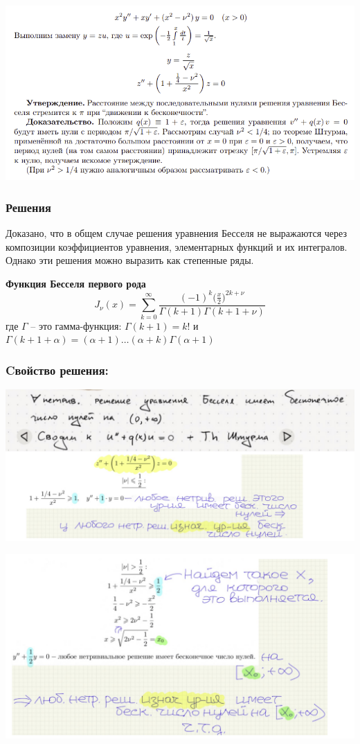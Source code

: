 \noindent\includegraphics[width=0.95\linewidth]{images/bess.png}

\subsubsection*{Решения}
Доказано, что в общем случае решения уравнения Бесселя не выражаются через композиции коэффициентов уравнения, элементарных функций и их интегралов. Однако эти
решения можно выразить как степенные ряды.

\textbf{Функция Бесселя первого рода}
\begin{equation*}
    J_\nu(x) = \sum\limits_{k=0}^{\infty}{\frac{(-1)^k\Big(\frac{x}{2}\Big)^{2k+\nu}}{\Gamma(k + 1)\Gamma(k+1+\nu)}}
\end{equation*}
где $\Gamma$ -- это гамма-функция: $\Gamma(k+1) = k!$ \;и\; $\Gamma(k+1+\alpha) = (\alpha+1)\ldots(\alpha+k)\Gamma(\alpha+1)$

\subsubsection*{Cвойство решения:}
\begin{center}
    \includegraphics[width=0.95\linewidth]{images/bess_1.png}
\end{center}
\begin{center}
    \includegraphics[width=0.95\linewidth]{images/bess_2.png}
\end{center}
\newpage